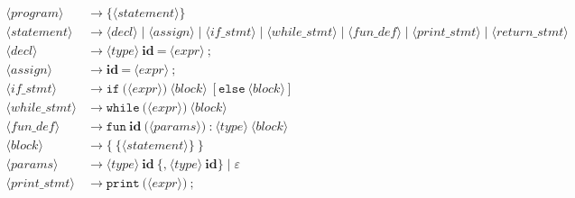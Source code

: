 \documentclass[12pt]{article}
\begin{document}
\shorthandoff{<>}
\begin{align*}
\langle program \rangle      &\to \{ \langle statement \rangle \} \\[4pt]
\langle statement \rangle    &\to \langle decl \rangle
                              \mid \langle assign \rangle
                              \mid \langle if\_stmt \rangle
                              \mid \langle while\_stmt \rangle
                              \mid \langle fun\_def \rangle
                              \mid \langle print\_stmt \rangle
                              \mid \langle return\_stmt \rangle \\[4pt]
\langle decl \rangle         &\to \langle type \rangle\ \textbf{id}
                                   \ \texttt{=}\ \langle expr \rangle
                                   \ \texttt{;} \\[4pt]
\langle assign \rangle       &\to \textbf{id}\ \texttt{=}
                                   \ \langle expr \rangle\ \texttt{;} \\[4pt]
\langle if\_stmt \rangle     &\to \texttt{if}\ \texttt{(}
                                   \langle expr \rangle \texttt{)}
                                   \ \langle block \rangle
                                   \ [ \texttt{else}\ \langle block \rangle ] \\[4pt]
\langle while\_stmt \rangle  &\to \texttt{while}\ \texttt{(}
                                   \langle expr \rangle \texttt{)}
                                   \ \langle block \rangle \\[4pt]
\langle fun\_def \rangle     &\to \texttt{fun}\ \textbf{id}\ \texttt{(}
                                   \langle params \rangle \texttt{)}
                                   \ \texttt{:}\ \langle type \rangle
                                   \ \langle block \rangle \\[4pt]
\langle block \rangle        &\to \texttt{\{}
                                   \ \{ \langle statement \rangle \}
                                   \ \texttt{\}} \\[4pt]
\langle params \rangle       &\to \langle type \rangle\ \textbf{id}
                                   \ \{ \texttt{,}\ \langle type \rangle
                                   \ \textbf{id} \}
                                   \mid \varepsilon \\[4pt]
\langle print\_stmt \rangle  &\to \texttt{print}\ \texttt{(}
                                   \langle expr \rangle \texttt{)}
                                   \ \texttt{;} \\[4pt]

\end{align*}
\end{document}
